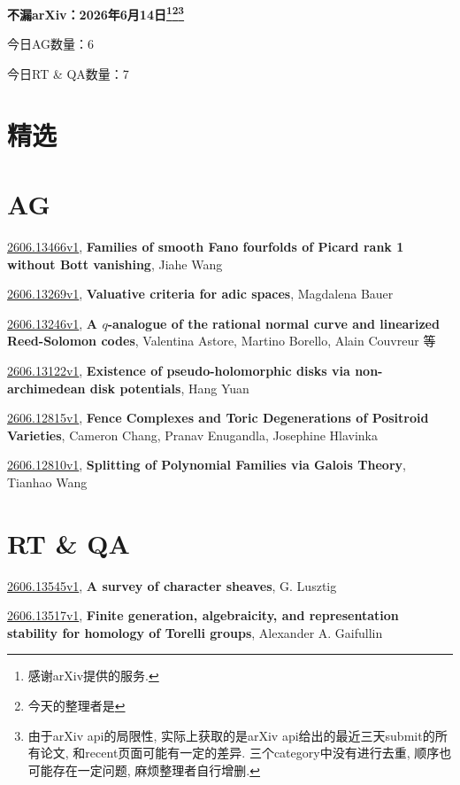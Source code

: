 \documentclass[9pt, a4paper]{article}
\theoremstyle{plain}
\theoremstyle{definition}
\theoremstyle{remark}
\newcommand{\arxiv}[3]{\href{https://arxiv.org/abs/#1}{#1}, \textbf{\textcolor{arxivblue}{#2}}, #3}
\newcommand{\AGnumber}{6}
\newcommand{\RTQAnumber}{7}
\newcommand{\NewestDate}{2026年6月14日}
\newcommand{\todayarXiver}{} %
\begin{document}
\begin{center}
    \Huge\textbf{不漏arXiv：\NewestDate\footnote{感谢arXiv提供的服务.}\footnote{今天的整理者是\todayarXiver}\footnote{由于arXiv api的局限性, 实际上获取的是arXiv api给出的最近三天submit的所有论文, 和recent页面可能有一定的差异. 三个category中没有进行去重, 顺序也可能存在一定问题, 麻烦整理者自行增删.}} \\
\end{center}

\setcounter{section}{-1}

\begin{center}
    今日AG数量：\AGnumber
    
    今日RT \& QA数量：\RTQAnumber
    
\end{center}


\section{精选}


\section{AG}
\arxiv{2606.13466v1}{Families of smooth Fano fourfolds of Picard rank 1 without Bott vanishing}{Jiahe Wang}

\arxiv{2606.13269v1}{Valuative criteria for adic spaces}{Magdalena Bauer}

\arxiv{2606.13246v1}{A $q$-analogue of the rational normal curve and linearized Reed-Solomon codes}{Valentina Astore, Martino Borello, Alain Couvreur 等}

\arxiv{2606.13122v1}{Existence of pseudo-holomorphic disks via non-archimedean disk potentials}{Hang Yuan}

\arxiv{2606.12815v1}{Fence Complexes and Toric Degenerations of Positroid Varieties}{Cameron Chang, Pranav Enugandla, Josephine Hlavinka}

\arxiv{2606.12810v1}{Splitting of Polynomial Families via Galois Theory}{Tianhao Wang}


\section{RT \& QA}
\arxiv{2606.13545v1}{A survey of character sheaves}{G. Lusztig}

\arxiv{2606.13517v1}{Finite generation, algebraicity, and representation stability for homology of Torelli groups}{Alexander A. Gaifullin}
\end{document}
